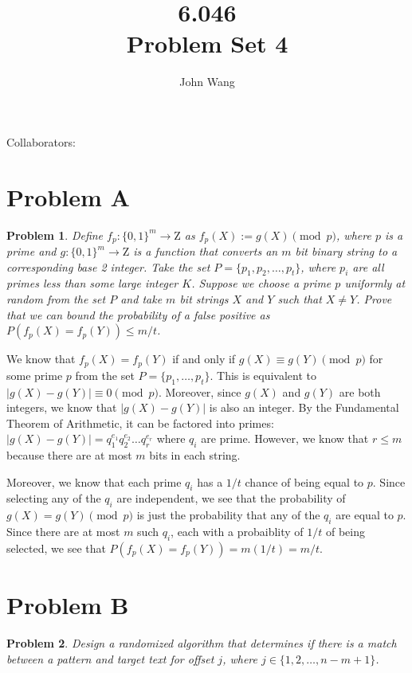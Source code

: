 \documentclass[psamsfonts]{amsart}
\title{6.046 \\
Problem Set 4}
\author{John Wang}
\newtheorem{prob}{Problem}[section]
\newenvironment{sol}{{\bfseries Solution}}{\qedsymbol}
\theoremstyle{definition}
\theoremstyle{remark}
\numberwithin{equation}{section}
\begin{document}
\maketitle

Collaborators: 

\section{Problem A}

\begin{prob}
Define $f_p: \{0,1\}^m \to \mathrm{Z}$ as $f_p(X) := g(X) \pmod{p}$, where $p$ is a prime and $g:\{0,1\}^{m} \to \mathrm{Z}$ is a function that converts an $m$ bit binary string to a corresponding base 2 integer. Take the set $P = \{p_1, p_2, \ldots, p_t \}$, where $p_i$ are all primes less than some large integer $K$. Suppose we choose a prime $p$ uniformly at random from the set $P$ and take $m$ bit strings $X$ and $Y$ such that $X \neq Y$. Prove that we can bound the probability of a false positive as $P(f_p(X) = f_p(Y)) \leq m/t$. 
\end{prob}

\begin{sol}
We know that $f_p(X) = f_p(Y)$ if and only if $g(X) \equiv g(Y) \pmod{p}$ for some prime $p$ from the set $P = \{p_1, \ldots, p_t \}$. This is equivalent to $|g(X) - g(Y)| \equiv 0 \pmod{p}$. Moreover, since $g(X)$ and $g(Y)$ are both integers, we know that $|g(X) - g(Y)|$ is also an integer. By the Fundamental Theorem of Arithmetic, it can be factored into primes: $|g(X) - g(Y)| = q_1^{e_1} q_2^{e_2} \ldots q_r^{e_r}$ where $q_i$ are prime. However, we know that $r \leq m$ because there are at most $m$ bits in each string.

Moreover, we know that each prime $q_i$ has a $1/t$ chance of being equal to $p$. Since selecting any of the $q_i$ are independent, we see that the probability of $g(X) = g(Y) \pmod{p}$ is just the probability that any of the $q_i$ are equal to $p$. Since there are at most $m$ such $q_i$, each with a probaiblity of $1/t$ of being selected, we see that $P(f_p(X) = f_p(Y)) = m (1/t) = m/t$.   
\end{sol}

\section{Problem B}

\begin{prob}
Design a randomized algorithm that determines if there is a match between a pattern and target text for offset $j$, where $j \in \{ 1,2, \ldots, n - m + 1\}$. 
\end{prob}
\end{document}

